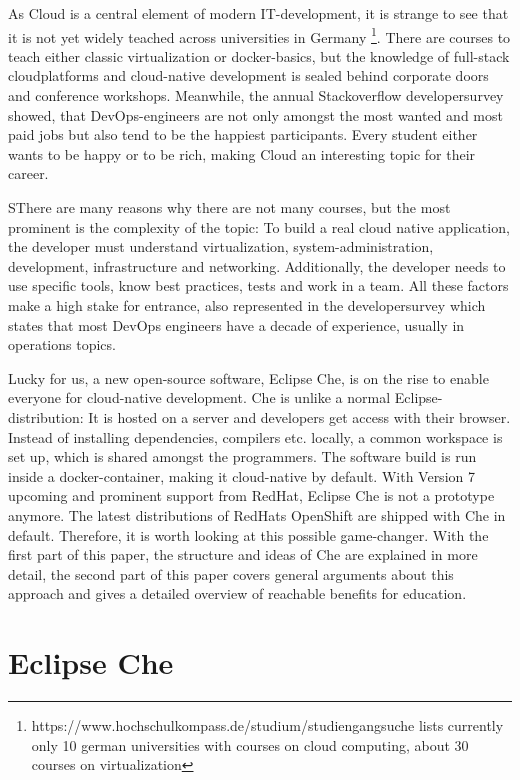 \documentclass[utf8]{lni}
\begin{document}
As Cloud is a central element of modern IT-development, it is strange to see that it is not yet widely teached across 
universities in Germany \footnote{https://www.hochschulkompass.de/studium/studiengangsuche lists currently only 10 german universities with courses on cloud computing, about 30 courses on virtualization }.
There are courses to teach either classic virtualization or docker-basics, but the knowledge of full-stack cloudplatforms and cloud-native development is sealed behind corporate doors and conference workshops.
Meanwhile,  the  annual  Stackoverflow  developersurvey \cite{SO19} showed, that DevOps-engineers are not only 
amongst the most wanted and most paid jobs but also tend to be the happiest participants.  
Every student either wants to be happy or to be rich, making Cloud an interesting topic for their career. 

SThere are many reasons why there are not many courses, but the most prominent is the complexity of the topic: 
To build a real cloud native application, the developer must understand virtualization, system-administration, development, 
infrastructure  and  networking. 
Additionally, the developer needs to use specific tools, know best practices, tests and work in a team.
All these factors make a high stake for entrance, also  represented in the developersurvey \cite{SO19} which states that most DevOps engineers have a decade of experience, usually in operations topics.

Lucky for us, a new open-source software, Eclipse Che, is on the rise to enable everyone for cloud-native development.
Che is unlike a normal Eclipse-distribution: 
It is hosted on a server and developers get access with their browser. 
Instead of installing dependencies, compilers etc. locally, a common workspace is set up, which is shared amongst the programmers. 
The software build is run inside a docker-container, making it cloud-native by default. 
With Version 7 upcoming and prominent support from RedHat, Eclipse Che is not a prototype anymore. 
The latest distributions of RedHats OpenShift are shipped with Che in default. 
Therefore, it is worth looking at this possible game-changer. 
With the first part of this paper, the structure and ideas of Che are explained in more detail, the second part of this paper covers general arguments about this approach and gives a detailed overview of reachable benefits for education.    

\section{Eclipse Che}
\label{sec:Che}
\end{document}
